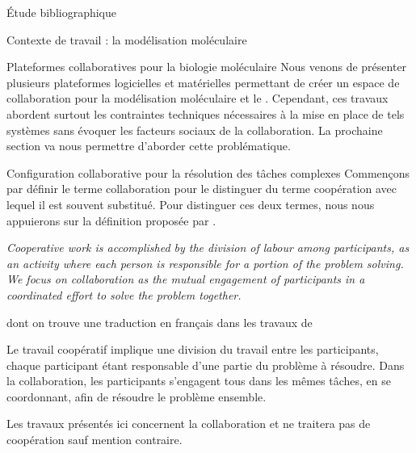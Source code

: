 \documentclass[myfrancais,ngerman,english,french]{mythesis}
\begin{document}
\begin{mychapter}{Étude bibliographique}
\begin{mysection}{Contexte de travail : la modélisation moléculaire}
\begin{mysubsection}{Plateformes collaboratives pour la biologie moléculaire}
				Nous venons de présenter plusieurs plateformes logicielles et matérielles permettant de créer un espace de collaboration pour la modélisation moléculaire et le .
				Cependant, ces travaux abordent surtout les contraintes techniques nécessaires à la mise en place de tels systèmes sans évoquer les facteurs sociaux de la collaboration.
				La prochaine section va nous permettre d'aborder cette problématique.
			\end{mysubsection}
		\end{mysection}
		\begin{mysection}{Configuration collaborative pour la résolution des tâches complexes}
			Commençons par définir le terme collaboration pour le distinguer du terme coopération avec lequel il est souvent substitué.
			Pour distinguer ces deux termes, nous nous appuierons sur la définition proposée par .
			\begin{myquote}[english]
				\it Cooperative work is accomplished by the division of labour among participants, as an activity where each person is responsible for a portion of the problem solving.
				We focus on collaboration as the mutual engagement of participants in a coordinated effort to solve the problem together.
			\end{myquote}
			dont on trouve une traduction en français dans les travaux de 
			\begin{myquote}[french]
				Le travail coopératif implique une division du travail entre les participants, chaque participant étant responsable d’une partie du problème à résoudre.
				Dans la collaboration, les participants s’engagent tous dans les mêmes tâches, en se coordonnant, afin de résoudre le problème ensemble.
			\end{myquote}
			Les travaux présentés ici concernent la collaboration et ne traitera pas de coopération sauf mention contraire.


\end{mysection}
\end{mychapter}
\end{document}
